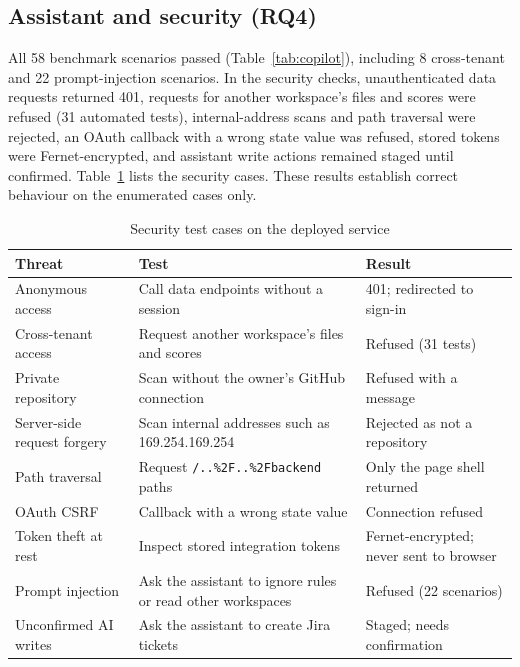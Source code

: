 \documentclass[conference]{IEEEtran}
\begin{document}
\subsection{Assistant and security (RQ4)}
All 58 benchmark scenarios passed (Table~\ref{tab:copilot}), including 8 cross-tenant and 22 prompt-injection scenarios. In the security checks, unauthenticated data requests returned 401, requests for another workspace's files and scores were refused (31 automated tests), internal-address scans and path traversal were rejected, an OAuth callback with a wrong state value was refused, stored tokens were Fernet-encrypted, and assistant write actions remained staged until confirmed. Table~\ref{tab:security} lists the security cases. These results establish correct behaviour on the enumerated cases only.

\begin{table}[t]
\caption{Security test cases on the deployed service}
\label{tab:security}
\centering
\scriptsize
\setlength{\tabcolsep}{2.5pt}
\begin{tabular}{@{}p{}p{}p{}@{}}
\toprule
Threat & Test & Result \\
\midrule
Anonymous access & Call data endpoints without a session & 401; redirected to sign-in \\
Cross-tenant access & Request another workspace's files and scores & Refused (31 tests) \\
Private repository & Scan without the owner's GitHub connection & Refused with a message \\
Server-side request forgery & Scan internal addresses such as 169.254.169.254 & Rejected as not a repository \\
Path traversal & Request \texttt{/..\%2F..\%2Fbackend} paths & Only the page shell returned \\
OAuth CSRF & Callback with a wrong state value & Connection refused \\
Token theft at rest & Inspect stored integration tokens & Fernet-encrypted; never sent to browser \\
Prompt injection & Ask the assistant to ignore rules or read other workspaces & Refused (22 scenarios) \\
Unconfirmed AI writes & Ask the assistant to create Jira tickets & Staged; needs confirmation \\
\bottomrule
\end{tabular}
\end{table}
\end{document}
